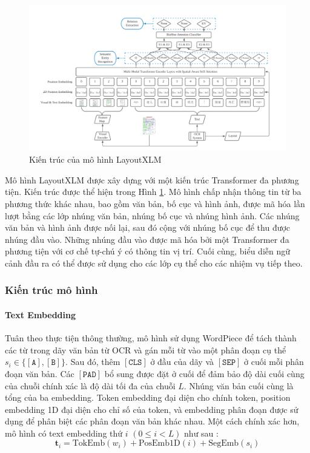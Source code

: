 \begin{figure}[h]
    \includegraphics[scale=0.42]{images/layoutxml-architecture.png}
    \caption{Kiến trúc của mô hình LayoutXLM}
    \label{layoutxml}
\end{figure}

Mô hình LayoutXLM được xây dựng với một kiến trúc Transformer đa phương tiện. Kiến trúc được thể hiện trong Hình \ref{layoutxml}. Mô hình chấp nhận thông tin từ ba phương thức khác nhau, bao gồm văn bản, bố cục và hình ảnh, được mã hóa lần lượt bằng các lớp nhúng văn bản, nhúng bố cục và nhúng hình ảnh. Các nhúng văn bản và hình ảnh được nối lại, sau đó cộng với nhúng bố cục để thu được nhúng đầu vào. Những nhúng đầu vào được mã hóa bởi một Transformer đa phương tiện với cơ chế tự-chú ý có thông tin vị trí. Cuối cùng, biểu diễn ngữ cảnh đầu ra có thể được sử dụng cho các lớp cụ thể cho các nhiệm vụ tiếp theo. 

\subsubsection{Kiến trúc mô hình}
\paragraph*{Text Embedding}
Tuân theo thực tiện thông thường, mô hình sử dụng WordPiece để tách thành các từ trong dãy văn bản từ OCR và gán mỗi từ vào một phân đoạn cụ thể $s_i \in \{\mathtt{[A]}, \mathtt{[B]}\}$. Sau đó, thêm $\mathtt{[CLS]}$ ở đầu của dãy và $\mathtt{[SEP]}$ ở cuối mỗi phân đoạn văn bản. Các $\mathtt{[PAD]}$ bổ sung được đặt ở cuối để đảm bảo độ dài cuối cùng của chuỗi chính xác là độ dài tối đa của chuỗi $L$. Nhúng văn bản cuối cùng là tổng của ba embedding. Token embedding đại diện cho chính token, position embedding 1D đại diện cho chỉ số của token, và embedding phân đoạn được sử dụng để phân biệt các phân đoạn văn bản khác nhau. Một cách chính xác hơn, mô hình có text embedding thứ $i$ $(0 \leq i < L)$ như sau \cite{xu2022layoutlmv2}:
\[
    \mathbf{t}_i = \text{TokEmb}(w_i) + \text{PosEmb1D}(i) + \text{SegEmb}(s_i)
\]

